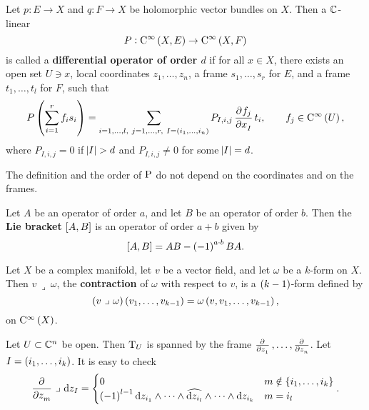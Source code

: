 \begin{definition}
Let $ p : E \to X $ and $ q : F \to X $ be holomorphic vector bundles on $ X $. Then a $ \CC $-linear
$$ P : \C^\infty\br{X, E} \to \C^\infty\br{X, F} $$
is called a \textbf{differential operator of order $ d $} if for all $ x \in X $, there exists an open set $ U \ni x $, local coordinates $ z_1, \dots, z_n $, a frame $ s_1, \dots, s_r $ for $ E $, and a frame $ t_1, \dots, t_l $ for $ F $, such that
$$ P\br{\sum_{i = 1}^r f_is_i} = \sum_{i = 1, \dots, l, \ j = 1, \dots, r, \ I = \br{i_1, \dots, i_n}} P_{I, i, j}\dpd{f_j}{x_I}t_i, \qquad f_j \in \C^\infty\br{U}, $$
where $ P_{I, i, j} = 0 $ if $ \abs{I} > d $ and $ P_{I, i, j} \ne 0 $ for some $ \abs{I} = d $.
\end{definition}

\begin{fact*}
The definition and the order of $ \P $ do not depend on the coordinates and on the frames.
\end{fact*}

\pagebreak

\begin{notation}
Let $ A $ be an operator of order $ a $, and let $ B $ be an operator of order $ b $. Then the \textbf{Lie bracket} $ \sbr{A, B} $ is an operator of order $ a + b $ given by
$$ \sbr{A, B} = AB - \br{-1}^{a \cdot b}BA. $$
\end{notation}

\begin{definition}
Let $ X $ be a complex manifold, let $ v $ be a vector field, and let $ \omega $ be a $ k $-form on $ X $. Then $ v \ \lrcorner \ \omega $, the \textbf{contraction} of $ \omega $ with respect to $ v $, is a $ \br{k - 1} $-form defined by
$$ \br{v \ \lrcorner \ \omega}\br{v_1, \dots, v_{k - 1}} = \omega\br{v, v_1, \dots, v_{k - 1}}, $$
on $ \C^\infty\br{X} $.
\end{definition}


\begin{example}
Let $ U \subset \CC^n $ be open. Then $ \T_U $ is spanned by the frame $ \tpd{}{z_1}, \dots, \tpd{}{z_n} $. Let $ I = \br{i_1, \dots, i_k} $. It is easy to check
$$ \dpd{}{z_m} \ \lrcorner \ \d z_I =
\begin{cases}
0 & m \notin \cbr{i_1, \dots, i_k} \\
\br{-1}^{l - 1}\d z_{i_1} \wedge \dots \wedge \widehat{\d z_{i_l}} \wedge \dots \wedge \d z_{i_k} & m = i_l
\end{cases}.
$$
\end{example}

